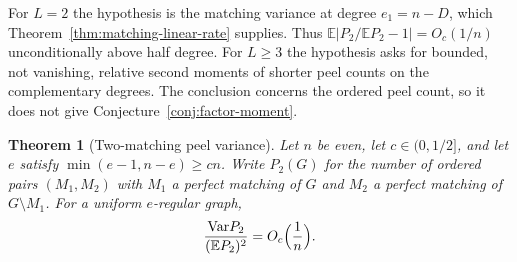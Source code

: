 \documentclass[11pt]{article}
\newtheorem{theorem}{Theorem}
\newcommand{\EE}{\mathbb{E}}
\newcommand{\Var}{\mathrm{Var}}
\begin{document}
For \(L=2\) the hypothesis is the matching variance at degree \(e_1=n-D\),
which Theorem~\ref{thm:matching-linear-rate} supplies.
Thus \(\EE|P_2/\EE P_2-1|=O_c(1/n)\) unconditionally above half degree.
For \(L\ge 3\) the hypothesis asks for bounded, not vanishing, relative
second moments of shorter peel counts on the complementary degrees.
The conclusion concerns the ordered peel count, so it does not give
Conjecture~\ref{conj:factor-moment}.

\begin{theorem}[Two-matching peel variance]
\label{thm:two-peel-variance}
Let \(n\) be even, let \(c\in(0,1/2]\), and let \(e\) satisfy
\(\min(e-1,n-e)\ge cn\).
Write \(P_2(G)\) for the number of ordered pairs \((M_1,M_2)\) with \(M_1\) a
perfect matching of \(G\) and \(M_2\) a perfect matching of \(G\setminus M_1\).
For a uniform \(e\)-regular graph,
\[
\frac{\Var P_2}{(\EE P_2)^2}=O_c\Bigl(\frac1n\Bigr).
\]
\end{theorem}
\end{document}

